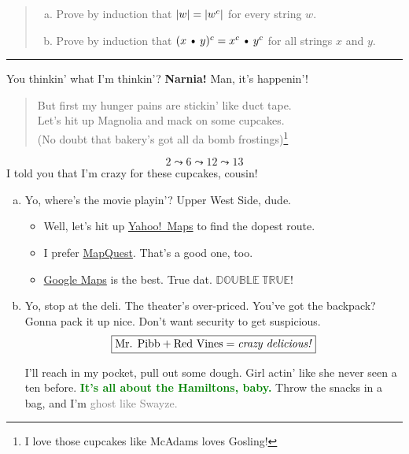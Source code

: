 \documentclass[11pt]{article}
\def\Cdot{\mathbin{\text{\normalfont \textbullet}}}
\begin{document}
\begin{quote}
\begin{enumerate}[(a)]
\item
Prove by induction that $\mathopen| w \mathclose| = \mathopen| w^c \mathclose|$ for every string $w$.
\item
Prove by induction that $(x\Cdot y)^c = x^c \Cdot y^c$ for all strings $x$ and $y$.
\end{enumerate}
\end{quote}
\hrule


\begin{solution}

You thinkin’ what I’m thinkin’? \textbf{Narnia!} Man, it’s happenin’!
\begin{quote}
\small
But first my hunger pains are stickin’ like duct tape.\\
Let’s hit up Magnolia and mack on some cupcakes.\\
(No doubt that bakery’s got all da bomb frostings)\footnote{I love those cupcakes like McAdams loves Gosling!}
\end{quote}
\[
	2 \leadsto 6 \leadsto 12 \leadsto 13
\]
I told you that I’m crazy for these cupcakes, cousin!

\begin{enumerate}[(a)]
\item
Yo, where’s the movie playin’?  Upper West Side, dude.
\begin{itemize}
\item
Well, let’s hit up \href{https://maps.yahoo.com/beta/}{Yahoo!~Maps} to find the dopest route.
\item
I prefer \href{http://www.mapquest.com/}{MapQuest}. That’s a good one, too.
\item
\href{https://www.google.com/maps}{Google Maps} is the best. True dat.  $\mathbb{DOUBLE~TRUE}!$
\end{itemize}

\item
Yo, stop at the deli. The theater's over-priced. You've got the backpack? Gonna pack it up nice.  Don't want security to get suspicious.
\[
	\mfbox{\text{Mr. Pibb} + \text{Red Vines} = \text{\emph{crazy delicious!}}}
\]

I’ll reach in my pocket, pull out some dough.  Girl actin' like she never seen a ten before.  \textcolor{Green}{\textbf{It's all about the \textsf{Hamiltons}, baby.}} Throw the snacks in a bag, and I’m \textcolor{Gray}{ghost \small like \footnotesize Swayze.}


\end{enumerate}
\end{solution}
\end{document}
